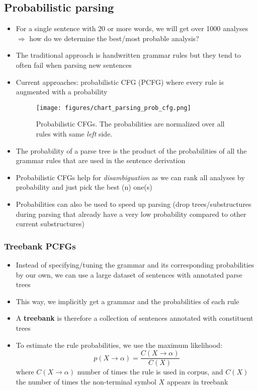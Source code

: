 \subsection{Probabilistic parsing}
\begin{itemize}
	\item For a single sentence with 20 or more words, we will get over 1000 analyses $\Rightarrow$ how do we determine the best/most probable analysis?
	\item The traditional approach is handwritten grammar rules but they tend to often fail when parsing new sentences
	\item  Current approaches: probabilistic CFG (PCFG) where every rule is augmented with a probability
	\begin{figure}[ht]
		\centering
		\texttt{[image: figures/chart\_parsing\_prob\_cfg.png]}
		\caption{Probabilistic CFGs. The probabilities are normalized over all rules with same \textit{left} side.}
		\label{fig:probabilistic_cfg}
	\end{figure}
	\item The probability of a parse tree is the product of the probabilities of all the grammar rules that are used in the sentence derivation
	\item Probabilistic CFGs help for \textit{disambiguation} as we can rank all analyses by probability and just pick the best (n) one(s)
	\item Probabilities can also be used to speed up parsing (drop trees/substructures during parsing that already have a very low probability compared to other current substructures)
\end{itemize}
\subsubsection{Treebank PCFGs}
\begin{itemize}
	\item Instead of specifying/tuning the grammar and its corresponding probabilities by our own, we can use a large dataset of sentences with annotated parse trees
	\item This way, we implicitly get a grammar and the probabilities of each rule
	\item A \textbf{treebank} is therefore a collection of sentences annotated with constituent trees
	\item To estimate the rule probabilities, we use the maximum likelihood:
	$$p(X\to \alpha) = \frac{C(X\to \alpha )}{C(X)}$$
	where $C(X\to \alpha)$ number of times the rule is used in corpus, and $C(X)$ the number of times the non-terminal symbol $X$ appears in treebank
\end{itemize}
